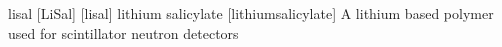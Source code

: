 \newglsXchemical%
{lisal}%
[LiSal]%
[lisal]%
{lithium salicylate}%
{}%
[lithiumsalicylate]%
{A lithium based polymer used for scintillator neutron detectors}%